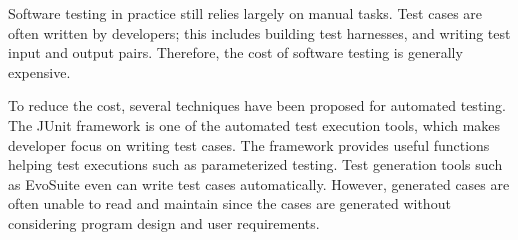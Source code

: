 \documentclass[conference]{IEEEtran}
\begin{document}

Software testing in practice still relies largely on manual tasks. Test cases are often written by developers; this includes building test harnesses, and writing test input and output pairs. Therefore, the cost of software testing is generally expensive. 

To reduce the cost, several techniques have been proposed for automated testing. The JUnit framework is one of the automated test execution tools, which makes developer focus on writing test cases. The framework provides useful functions helping test executions such as parameterized testing. Test generation tools such as EvoSuite\cite{b3} even can write test cases automatically. However, generated cases are often unable to read and maintain since the cases are generated without considering program design and user requirements. 





\end{document}
